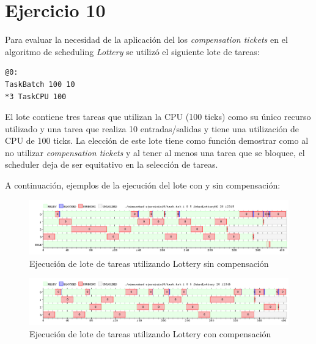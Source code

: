 \documentclass[a4paper,10pt,twoside]{article}
\begin{document}

\section{Ejercicio 10}

Para evaluar la necesidad de la aplicación del los \textit{compensation tickets} en el algoritmo de scheduling \textit{Lottery} se utilizó el siguiente lote de tareas:
\begin{verbatim}
@0:
TaskBatch 100 10
*3 TaskCPU 100
\end{verbatim}
El lote contiene tres tareas que utilizan la CPU (100 ticks) como su único recurso utilizado y una tarea que realiza 10 entradas/salidas y tiene una utilización de CPU de 100 ticks. La elección de este lote tiene como función demostrar como al no utilizar \textit{compensation tickets} y al tener al menos una tarea que se bloquee, el scheduler deja de ser equitativo en la selección de tareas.

A continuación, ejemplos de la ejecución del lote con y sin compensación:

\begin{figure}[H]
\centering
\includegraphics[width=175mm]{../ejercicio10/GraphSchedLotNC.png}
\caption{Ejecución de lote de tareas utilizando Lottery sin compensación}
\label{GraphSchedLotNC}
\end{figure}


\begin{figure}[H]
\centering
\includegraphics[width=175mm]{../ejercicio10/GraphSchedLot.png}
\caption{Ejecución de lote de tareas utilizando Lottery con compensación}
\label{GraphSchedLot}
\end{figure}
\end{document}
